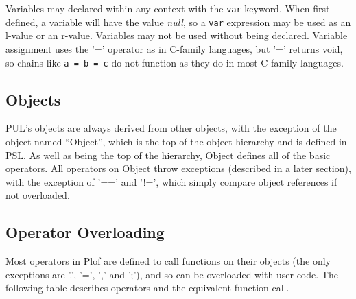 Variables may declared within any context with the \texttt{var} keyword. When first defined, a variable will have the value \textit{null}, so a \texttt{var} expression may be used as an l-value or an r-value. Variables may not be used without being declared. Variable assignment uses the '=' operator as in C-family languages, but '=' returns void, so chains like \texttt{a = b = c} do not function as they do in most C-family languages.



\subsection{Objects}

PUL's objects are always derived from other objects, with the exception of the object named “Object”, which is the top of the object hierarchy and is defined in PSL. As well as being the top of the hierarchy, Object defines all of the basic operators. All operators on Object throw exceptions (described in a later section), with the exception of '==' and '!=', which simply compare object references if not overloaded.



\subsection{Operator Overloading}

Most operators in Plof are defined to call functions on their objects (the only exceptions are '.', '=', ',' and ';'), and so can be overloaded with user code. The following table describes operators and the equivalent function call.



